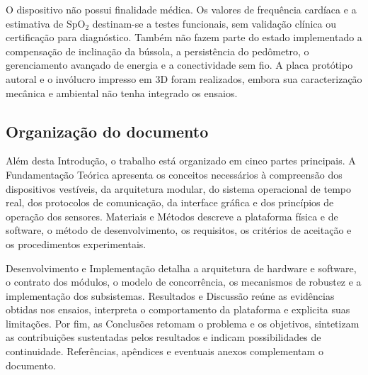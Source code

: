 \documentclass[a4paper,12pt]{article}
\begin{document}
O dispositivo n\~ao possui finalidade m\'edica. Os valores de frequ\^encia card\'iaca e a estimativa de SpO$_2$ destinam-se a testes funcionais, sem valida\c{c}\~ao cl\'inica ou certifica\c{c}\~ao para diagn\'ostico. Tamb\'em n\~ao fazem parte do estado implementado a compensa\c{c}\~ao de inclina\c{c}\~ao da b\'ussola, a persist\^encia do ped\^ometro, o gerenciamento avan\c{c}ado de energia e a conectividade sem fio. A placa prot\'otipo autoral e o inv\'olucro impresso em 3D foram realizados, embora sua caracteriza\c{c}\~ao mec\^anica e ambiental n\~ao tenha integrado os ensaios.

\subsection{Organiza\c{c}\~ao do documento}

Al\'em desta Introdu\c{c}\~ao, o trabalho est\'a organizado em cinco partes principais. A Fundamenta\c{c}\~ao Te\'orica apresenta os conceitos necess\'arios \`a compreens\~ao dos dispositivos vest\'iveis, da arquitetura modular, do sistema operacional de tempo real, dos protocolos de comunica\c{c}\~ao, da interface gr\'afica e dos princ\'ipios de opera\c{c}\~ao dos sensores. Materiais e M\'etodos descreve a plataforma f\'isica e de software, o m\'etodo de desenvolvimento, os requisitos, os crit\'erios de aceita\c{c}\~ao e os procedimentos experimentais.

Desenvolvimento e Implementa\c{c}\~ao detalha a arquitetura de hardware e software, o contrato dos m\'odulos, o modelo de concorr\^encia, os mecanismos de robustez e a implementa\c{c}\~ao dos subsistemas. Resultados e Discuss\~ao re\'une as evid\^encias obtidas nos ensaios, interpreta o comportamento da plataforma e explicita suas limita\c{c}\~oes. Por fim, as Conclus\~oes retomam o problema e os objetivos, sintetizam as contribui\c{c}\~oes sustentadas pelos resultados e indicam possibilidades de continuidade. Refer\^encias, ap\^endices e eventuais anexos complementam o documento.
\end{document}
